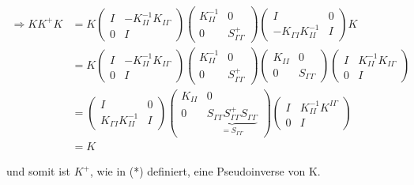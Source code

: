 \begin{align*}
  \Rightarrow KK^+K &= 
  K
  \begin{pmatrix}
    I& -K_{II}^{-1}K_{I\Gamma}\\
    0& I
  \end{pmatrix}
  \begin{pmatrix}
    K_{II}^{-1}& 0\\
    0& S_{\Gamma\Gamma}^+
  \end{pmatrix}
  \begin{pmatrix}
    I& 0\\
    -K_{\Gamma I}K_{II}^{-1}& I
  \end{pmatrix}
  K\\
  &=
  K 
 \begin{pmatrix}
    I& -K_{II}^{-1}K_{I\Gamma}\\
    0& I
  \end{pmatrix}
  \begin{pmatrix}
    K_{II}^{-1}& 0\\
    0& S_{\Gamma\Gamma}^+
  \end{pmatrix}
  \begin{pmatrix}
    K_{II}& 0\\
    0& S_{\Gamma\Gamma}
  \end{pmatrix}
  \begin{pmatrix}
    I& K_{II}^{-1}K_{I\Gamma}\\
    0& I
  \end{pmatrix}\\
  &=
  \begin{pmatrix}
    I& 0\\
    K_{\Gamma I}K_{II}^{-1}& I
  \end{pmatrix}
  \begin{pmatrix}
    K_{II}& 0\\
    0&  \underbrace{S_{\Gamma\Gamma}S_{\Gamma\Gamma}^+S_{\Gamma\Gamma}}_{=S_{\Gamma\Gamma}}
  \end{pmatrix}
  \begin{pmatrix}
    I& K_{II}^{-1}K^{I\Gamma}\\
    0& I
  \end{pmatrix}\\
  &= K
\end{align*}


und somit ist $K^+$, wie in (*) definiert, eine Pseudoinverse von K.

